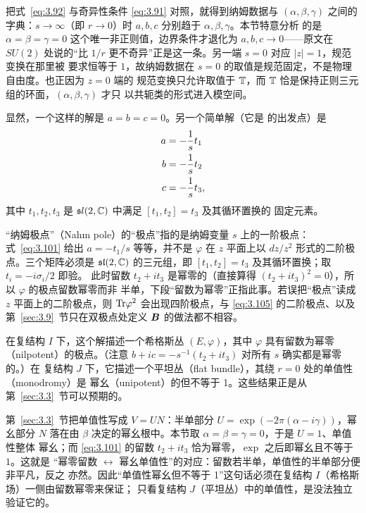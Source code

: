 \begin{yizhu}[含糊点拨]
把式~\eqref{eq:3.92} 与奇异性条件 \eqref{eq:3.91} 对照，就得到纳姆数据与 $(\alpha,\beta,\gamma)$
之间的字典：$s\to\infty$（即 $r\to 0$）时 $a,b,c$ 分别趋于 $\alpha,\beta,\gamma$。本节特意分析
的是 $\alpha=\beta=\gamma=0$ 这个唯一非正则值，边界条件才退化为 $a,b,c\to 0$——原文在
$SU(2)$ 处说的“比 $1/r$ 更不奇异”正是这一条。另一端 $s=0$ 对应 $|z|=1$，规范变换在那里被
要求恒等于 $1$，故纳姆数据在 $s=0$ 的取值是规范固定，不是物理自由度。也正因为 $z=0$ 端的
规范变换只允许取值于 ${\mathbb{T}}$，而 ${\mathbb{T}}$ 恰是保持正则三元组的环面，$(\alpha,\beta,\gamma)$ 才只
以共轭类的形式进入模空间。
\end{yizhu}

显然，一个这样的解是 $a=b=c=0$。另一个简单解（它是 \cite{ref35} 的出发点）是
\setcounter{equation}{100}
\begin{equation}\label{eq:3.101}
  \begin{aligned}a&=-{1\over s}t_1\\
                    b&=-{1\over s}t_2\\
                    c&=-{1\over s}t_3,\end{aligned}
\end{equation}
其中 $t_1,t_2,t_3$ 是 ${\mathfrak sl}(2,{\mathbb{C}})$ 中满足 $[t_1,t_2]=t_3$ 及其循环置换的
固定元素。

\begin{yizhu}[易错点]
“纳姆极点”（Nahm pole）的“极点”指的是纳姆变量 $s$ 上的一阶极点：式~\eqref{eq:3.101} 给出
$a=-t_1/s$ 等等，并不是 $\varphi$ 在 $z$ 平面上以 $dz/z^2$ 形式的二阶极点。三个矩阵必须是
$\mathfrak{sl}(2,{\mathbb{C}})$ 的三元组，即 $[t_1,t_2]=t_3$ 及其循环置换；取 $t_i=-i\sigma_i/2$ 即验。
此时留数 $t_2+it_3$ 是幂零的（直接算得 $(t_2+it_3)^2=0$），所以 $\varphi$ 的极点留数幂零而非
半单，下段“留数为幂零”正指此事。若误把“极点”读成 $z$ 平面上的二阶极点，则 ${\rm Tr}\varphi^2$
会出现四阶极点，与 \eqref{eq:3.105} 的二阶极点、以及第~\ref{sec:3.9}~节只在双极点处定义
$\bm{B}$ 的做法都不相容。
\end{yizhu}

在复结构 $I$ 下，这个解描述一个希格斯丛 $(E,\varphi)$，其中 $\varphi$ 具有留数为幂零
（nilpotent）的极点。（注意 $b+ic=-s^{-1}(t_2+it_3)$ 对所有 $s$ 确实都是幂零的。）在
复结构 $J$ 下，它描述一个平坦丛（flat bundle），其绕 $r=0$ 处的单值性（monodromy）是
幂幺（unipotent）的但不等于 1。这些结果正是从第~\ref{sec:3.3}~节可以预期的。

\begin{yizhu}[含糊点拨]
第~\ref{sec:3.3}~节把单值性写成 $V=UN$：半单部分 $U=\exp(-2\pi(\alpha-i\gamma))$，幂幺部分
$N$ 落在由 $\beta$ 决定的幂幺根中。本节取 $\alpha=\beta=\gamma=0$，于是 $U=1$、单值性整体
幂幺；而 \eqref{eq:3.101} 的留数 $t_2+it_3$ 恰为幂零，$\exp$ 之后即幂幺且不等于 $1$。这就是
“幂零留数 $\leftrightarrow$ 幂幺单值性”的对应：留数若半单，单值性的半单部分便非平凡，反之
亦然。因此“单值性幂幺但不等于 1”这句话必须在复结构 $I$（希格斯场）一侧由留数幂零来保证；
只看复结构 $J$（平坦丛）中的单值性，是没法独立验证它的。
\end{yizhu}

